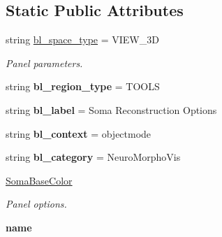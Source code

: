 \subsection*{Static Public Attributes}
\begin{DoxyCompactItemize}
\item 
string \hyperlink{classui__soft__body__panel_1_1SoftBodyOptions_a89320097b66bc4a677875ef66b827a89}{bl\+\_\+space\+\_\+type} = \textquotesingle{}V\+I\+E\+W\+\_\+3D\textquotesingle{}\hypertarget{classui__soft__body__panel_1_1SoftBodyOptions_a89320097b66bc4a677875ef66b827a89}{}\label{classui__soft__body__panel_1_1SoftBodyOptions_a89320097b66bc4a677875ef66b827a89}

\begin{DoxyCompactList}\small\item\em Panel parameters. \end{DoxyCompactList}\item 
string {\bfseries bl\+\_\+region\+\_\+type} = \textquotesingle{}T\+O\+O\+LS\textquotesingle{}\hypertarget{classui__soft__body__panel_1_1SoftBodyOptions_a4d8608ffbae81d14be19d2da5a8374f9}{}\label{classui__soft__body__panel_1_1SoftBodyOptions_a4d8608ffbae81d14be19d2da5a8374f9}

\item 
string {\bfseries bl\+\_\+label} = \textquotesingle{}Soma Reconstruction Options\textquotesingle{}\hypertarget{classui__soft__body__panel_1_1SoftBodyOptions_a0b43e1970d0d1ffa926876551cfc4f36}{}\label{classui__soft__body__panel_1_1SoftBodyOptions_a0b43e1970d0d1ffa926876551cfc4f36}

\item 
string {\bfseries bl\+\_\+context} = \textquotesingle{}objectmode\textquotesingle{}\hypertarget{classui__soft__body__panel_1_1SoftBodyOptions_a0cbe3da0eeaaf4c1bf6c980985f8ff18}{}\label{classui__soft__body__panel_1_1SoftBodyOptions_a0cbe3da0eeaaf4c1bf6c980985f8ff18}

\item 
string {\bfseries bl\+\_\+category} = \textquotesingle{}Neuro\+Morpho\+Vis\textquotesingle{}\hypertarget{classui__soft__body__panel_1_1SoftBodyOptions_ab08c34b3eb77458ab0a3d96b6956bb8e}{}\label{classui__soft__body__panel_1_1SoftBodyOptions_ab08c34b3eb77458ab0a3d96b6956bb8e}

\item 
\hyperlink{classui__soft__body__panel_1_1SoftBodyOptions_a2eb43250156100f98065ebb25a63e45e}{Soma\+Base\+Color}
\begin{DoxyCompactList}\small\item\em Panel options. \end{DoxyCompactList}\item 
{\bfseries name}\hypertarget{classui__soft__body__panel_1_1SoftBodyOptions_a576ffd291fbdf4f522ea37383b893c26}{}\label{classui__soft__body__panel_1_1SoftBodyOptions_a576ffd291fbdf4f522ea37383b893c26}


\end{DoxyCompactItemize}
